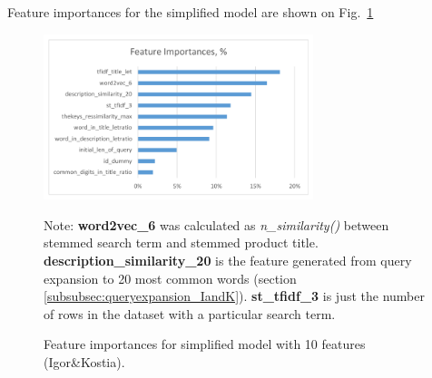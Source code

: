 \documentclass[12pt]{article}
\begin{document}
{{Feature importances for the simplified model are shown on Fig.~\ref{Fig:feature_importance_simplified_IandK}

\begin{figure}
  \centering
  \includegraphics[width=0.7\textwidth]{../Fig/plot_feature_importances_simplified_model.pdf}\\
  \caption{Feature importances for simplified model with 10 features (Igor\&Kostia).}
  \label{Fig:feature_importance_simplified_IandK}
Note: \textbf{word2vec\_6} was calculated as \emph{n\_similarity()} between stemmed search term and stemmed product title.
\textbf{description\_similarity\_20} is the feature generated from query expansion to 20 most common words (section \ref{subsubsec:queryexpansion_IandK}). \textbf{st\_tfidf\_3} is just the number of rows in the dataset with a particular search term.
\end{figure}



}}
\end{document}
